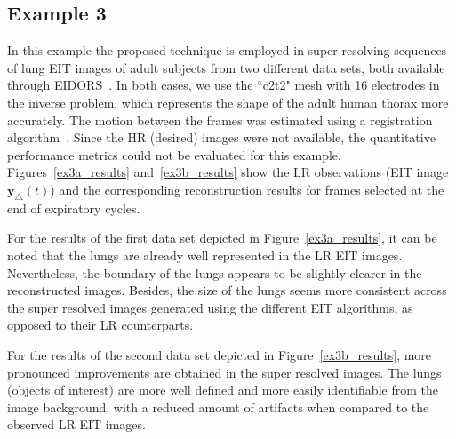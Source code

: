 \documentclass[10pt]{IEEEtran}
\newcommand{\cred}{}
\newcommand{\vy}{\mathbf{y}}
\begin{document}
\subsection{Example 3}

In this example the proposed technique is employed in super-resolving sequences of lung EIT images of adult subjects from two different data sets, both available through EIDORS~\cite{Adler06eidors}.
%
In both cases, we use the ``c2t2" mesh with 16 electrodes in the inverse problem, which represents the shape of the adult human thorax more accurately.
%
The motion between the frames was estimated using a registration algorithm~\cite{Sun10}.
%
Since the HR (desired) images were not available, the quantitative performance metrics could not be evaluated for this example.
%
Figures~\ref{ex3a_results} and~\ref{ex3b_results} show the LR observations (EIT image $\vy_{\triangle}(t)$) and the corresponding reconstruction results for frames selected at the end of expiratory cycles.


For the results of the first data set depicted in Figure~\ref{ex3a_results}, it can be noted that the lungs are already well represented in the LR EIT images.
%
Nevertheless, the boundary of the lungs appears to be slightly clearer in the reconstructed images. Besides, the size of the lungs seems more consistent across the super resolved images generated using the different EIT algorithms, as opposed to their LR counterparts.




For the results of the second data set depicted in Figure~\ref{ex3b_results}, more pronounced improvements are obtained in the super resolved images.
%
The lungs (objects of interest) are more well defined and more easily identifiable from the image background, with a reduced amount of artifacts when compared to the observed LR EIT images.











\end{document}
